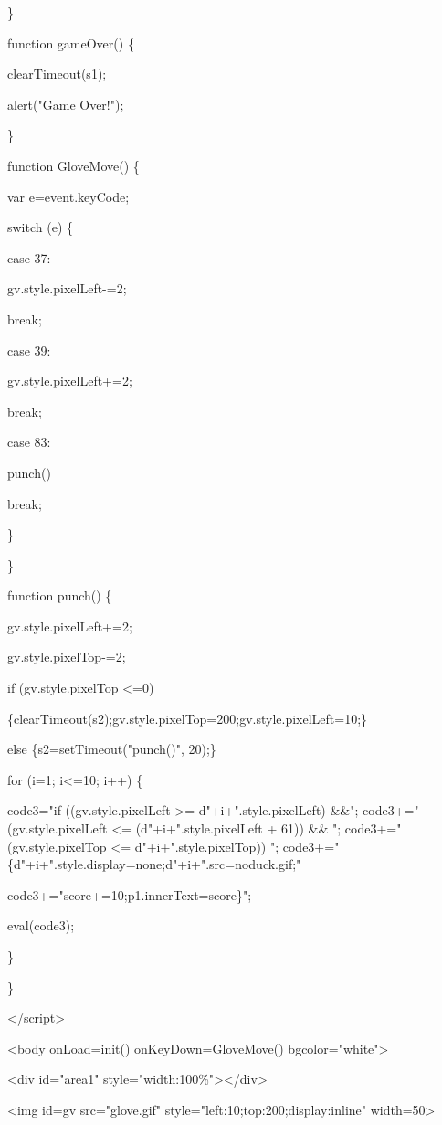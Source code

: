 \documentclass[
]{article}
\begin{document}
\}

function gameOver() \{

clearTimeout(s1);

alert("Game Over!");

\}

function GloveMove() \{

var e=event.keyCode;

switch (e) \{

case 37:

gv.style.pixelLeft-=2;

break;

case 39:

gv.style.pixelLeft+=2;

break;

case 83:

punch()

break;

\}

\}

function punch() \{

gv.style.pixelLeft+=2;

gv.style.pixelTop-=2;

if (gv.style.pixelTop \textless=0)

\{clearTimeout(s2);gv.style.pixelTop=200;gv.style.pixelLeft=10;\}

else \{s2=setTimeout("punch()", 20);\}

for (i=1; i\textless=10; i++) \{

code3="if ((gv.style.pixelLeft \textgreater= d"+i+".style.pixelLeft)
\&\&"; code3+=" (gv.style.pixelLeft \textless= (d"+i+".style.pixelLeft +
61)) \&\& "; code3+=" (gv.style.pixelTop \textless=
d"+i+".style.pixelTop)) ";
code3+="\{d"+i+".style.display=\textquotesingle none\textquotesingle;d"+i+".src=\textquotesingle noduck.gif\textquotesingle;"

code3+="score+=10;p1.innerText=score\}";

eval(code3);

\}

\}

\textless/script\textgreater{}

\textless body onLoad=init() onKeyDown=GloveMove()
bgcolor="white"\textgreater{}

\textless div id="area1"
style="width:100\%"\textgreater\textless/div\textgreater{}

\textless img id=\textquotesingle gv\textquotesingle{} src="glove.gif"
style="left:10;top:200;display:\textquotesingle inline\textquotesingle"
width=50\textgreater{}
\end{document}
